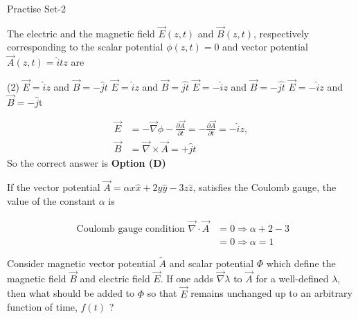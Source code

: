 \newpage
\begin{abox}
	Practise Set-2
\end{abox}
\begin{enumerate}
	\begin{minipage}{\textwidth}
		\item   The electric and the magnetic field $\vec{E}(z, t)$ and $\vec{B}(z, t)$, respectively corresponding to the scalar potential $\phi(z, t)=0$ and vector potential $\vec{A}(z, t)=\hat{i} t z$ are
	\end{minipage}
	\begin{tasks}(2)
		\task[\textbf{A.}] $\vec{E}=\hat{i} z$ and $\vec{B}=-\hat{j} t$
		\task[\textbf{B.}]$\vec{E}=\hat{i} z$ and $\vec{B}=\hat{j t}$
		\task[\textbf{C.}]$\vec{E}=-\hat{i} z$ and $\vec{B}=-\hat{j t}$
		\task[\textbf{D.}]$\vec{E}=-\hat{i} z$ and $\vec{B}=-\hat{j} \mathrm{t}$
	\end{tasks}
\begin{answer}
	\begin{align*}
	\vec{E}&=-\vec{\nabla} \phi-\frac{\partial \vec{A}}{\partial t}=-\frac{\partial \vec{A}}{\partial t}=-\hat{i} z,\\\vec{B}&=\vec{\nabla} \times \vec{A}=+\hat{j} t
	\end{align*}
	So the correct answer is \textbf{Option (D)}
\end{answer}
	\begin{minipage}{\textwidth}
		\item If the vector potential $\vec{A}=\alpha x \hat{x}+2 y \hat{y}-3 z \hat{z}$, satisfies the Coulomb gauge, the value of the constant $\alpha$ is
	\end{minipage}
\begin{answer}
	\begin{align*}
	\text{	Coulomb gauge condition }\vec{\nabla} \cdot \vec{A}&=0 \Rightarrow \alpha+2-3\\&=0 \Rightarrow \alpha=1
	\end{align*}
\end{answer}
	\begin{minipage}{\textwidth}
		\item Consider magnetic vector potential $\tilde{A}$ and scalar potential $\Phi$ which define the magnetic field $\vec{B}$ and electric field $\vec{E}$. If one adds $\vec{\nabla} \lambda$ to $\vec{A}$ for a well-defined $\lambda$, then what should be added to $\Phi$ so that $\vec{E}$ remains unchanged up to an arbitrary function of time, $f(t)$ ?

\end{minipage}
\end{enumerate}
